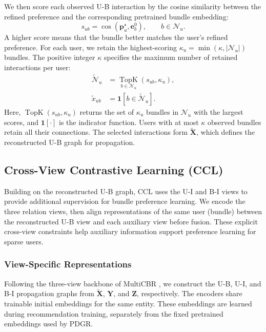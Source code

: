 \documentclass[letterpaper,journal]{IEEEtran}
\begin{document}
We then score each observed U-B interaction by the cosine similarity between the refined preference and the corresponding pretrained bundle embedding:
\begin{equation}
s_{ub}
=\cos(\mathbf p_u^\star,\mathbf e_b^0),
\qquad b\in\mathcal N_u.
\tag{11}
\end{equation}
A higher score means that the bundle better matches the user's refined preference. For each user, we retain the highest-scoring $\kappa_u=\min(\kappa,|\mathcal N_u|)$ bundles. The positive integer $\kappa$ specifies the maximum number of retained interactions per user:
\begin{equation}
\begin{aligned}
\widetilde{\mathcal N}_u
&=\underset{b\in\mathcal N_u}{\operatorname{TopK}}
\left(s_{ub},\kappa_u\right),\\
\widetilde x_{ub}
&=\mathbf 1\!\left[b\in\widetilde{\mathcal N}_u\right].
\end{aligned}
\tag{12}
\end{equation}
Here, $\operatorname{TopK}(s_{ub},\kappa_u)$ returns the set of $\kappa_u$ bundles in $\mathcal N_u$ with the largest scores, and $\mathbf 1[\cdot]$ is the indicator function. Users with at most $\kappa$ observed bundles retain all their connections. The selected interactions form $\widetilde{\mathbf X}$, which defines the reconstructed U-B graph for propagation.

\subsection{Cross-View Contrastive Learning (CCL)}

Building on the reconstructed U-B graph, CCL uses the U-I and B-I views to provide additional supervision for bundle preference learning. We encode the three relation views, then align representations of the same user (bundle) between the reconstructed U-B view and each auxiliary view before fusion. These explicit cross-view constraints help auxiliary information support preference learning for sparse users.

\subsubsection{View-Specific Representations}

Following the three-view backbone of MultiCBR \cite{ma2024multicbr}, we construct the U-B, U-I, and B-I propagation graphs from $\widetilde{\mathbf X}$, $\mathbf Y$, and $\mathbf Z$, respectively. The encoders share trainable initial embeddings for the same entity. These embeddings are learned during recommendation training, separately from the fixed pretrained embeddings used by PDGR.
\end{document}
